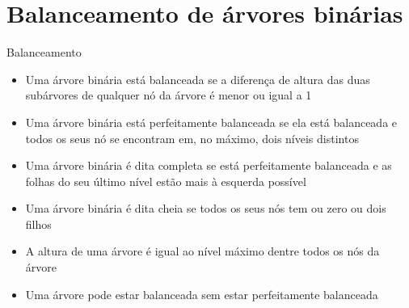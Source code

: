 \section{Balanceamento de árvores binárias}

\begin{frame}[fragile]{Balanceamento}

	\begin{itemize}
		\item Uma árvore binária está balanceada se a diferença de altura das duas subárvores de 
            qualquer nó da árvore é menor ou igual a 1

        \item Uma árvore binária está perfeitamente balanceada se ela está balanceada e todos os 
            seus nó se encontram em, no máximo, dois níveis distintos

        \item Uma árvore binária é dita completa se está perfeitamente balanceada 
            e as folhas do seu último nível estão mais à esquerda possível

        \item Uma árvore binária é dita cheia se todos os seus nós tem ou zero ou dois filhos

        \item A altura de uma árvore é igual ao nível máximo dentre todos os nós da árvore

        \item Uma árvore pode estar balanceada sem estar perfeitamente balanceada
	\end{itemize}

\end{frame} 
 

